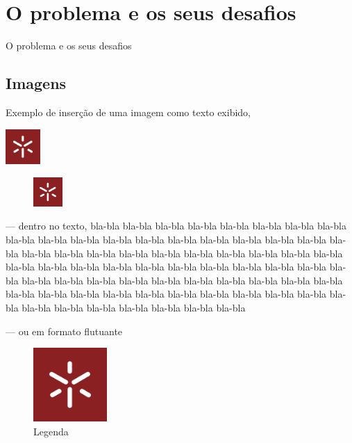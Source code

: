 \chapter{O problema e os seus desafios}

O problema e os seus desafios

\section{Imagens}
Exemplo de inserção de uma imagem como texto exibido,
\begin{center}
	\includegraphics[width=0.1\textwidth]{images/UM.jpg}
\end{center}

\begin{figure}	
	\includegraphics[width=0.1\textwidth]{images/UM.jpg}
\end{figure}
\noindent --- dentro no texto,
bla-bla bla-bla bla-bla bla-bla bla-bla bla-bla bla-bla bla-bla bla-bla bla-bla
bla-bla bla-bla bla-bla bla-bla bla-bla bla-bla bla-bla bla-bla bla-bla bla-bla
bla-bla bla-bla bla-bla bla-bla bla-bla bla-bla bla-bla bla-bla bla-bla bla-bla
bla-bla bla-bla bla-bla bla-bla bla-bla bla-bla bla-bla bla-bla bla-bla bla-bla
bla-bla bla-bla bla-bla bla-bla bla-bla bla-bla bla-bla bla-bla bla-bla bla-bla bla-bla bla-bla bla-bla bla-bla
bla-bla bla-bla bla-bla bla-bla bla-bla bla-bla bla-bla bla-bla bla-bla bla-bla bla-bla bla-bla bla-bla bla-bla

\noindent --- ou em formato flutuante
\begin{figure}
\begin{center}
	\includegraphics[width=0.25\textwidth]{images/UM.jpg}
\end{center}
\caption{Legenda}
\end{figure}

